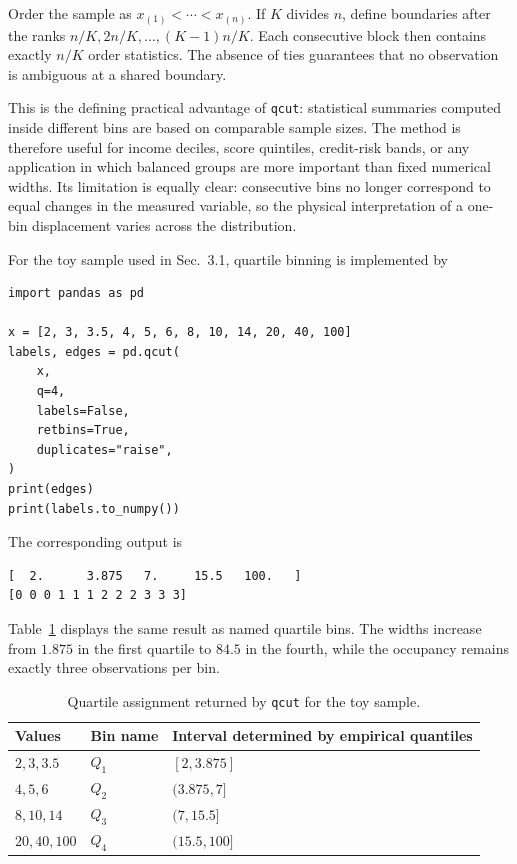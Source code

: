 \begin{demonstration}
Order the sample as $x_{(1)}<\cdots<x_{(n)}$. If $K$ divides $n$, define boundaries after the ranks $n/K,2n/K,\ldots,(K-1)n/K$. Each consecutive block then contains exactly $n/K$ order statistics. The absence of ties guarantees that no observation is ambiguous at a shared boundary.
\end{demonstration}

This is the defining practical advantage of \texttt{qcut}: statistical summaries computed inside different bins are based on comparable sample sizes. The method is therefore useful for income deciles, score quintiles, credit-risk bands, or any application in which balanced groups are more important than fixed numerical widths. Its limitation is equally clear: consecutive bins no longer correspond to equal changes in the measured variable, so the physical interpretation of a one-bin displacement varies across the distribution.

For the toy sample used in Sec.~3.1, quartile binning is implemented by
\begin{lstlisting}[caption={Quartile binning with pandas.qcut.}]
import pandas as pd

x = [2, 3, 3.5, 4, 5, 6, 8, 10, 14, 20, 40, 100]
labels, edges = pd.qcut(
    x,
    q=4,
    labels=False,
    retbins=True,
    duplicates="raise",
)
print(edges)
print(labels.to_numpy())
\end{lstlisting}
The corresponding output is
\begin{lstlisting}[caption={Output of the quartile example.},numbers=none]
[  2.      3.875   7.     15.5   100.   ]
[0 0 0 1 1 1 2 2 2 3 3 3]
\end{lstlisting}

Table~\ref{tab:qcut-example} displays the same result as named quartile bins. The widths increase from $1.875$ in the first quartile to $84.5$ in the fourth, while the occupancy remains exactly three observations per bin.

\begin{table}[htbp]
\centering
\caption{Quartile assignment returned by \texttt{qcut} for the toy sample.}
\label{tab:qcut-example}
\begin{tabular}{lll}
\toprule
Values & Bin name & Interval determined by empirical quantiles \\
\midrule
$2,3,3.5$ & $Q_1$ & $[2,3.875]$ \\
$4,5,6$ & $Q_2$ & $(3.875,7]$ \\
$8,10,14$ & $Q_3$ & $(7,15.5]$ \\
$20,40,100$ & $Q_4$ & $(15.5,100]$ \\
\bottomrule
\end{tabular}
\end{table}

